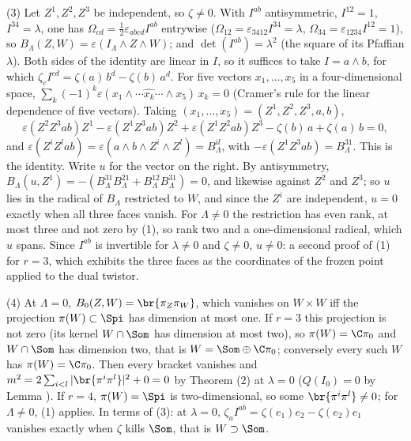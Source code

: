 (3) Let $Z^{1}, Z^{2}, Z^{3}$ be independent, so $\zeta \ne 0$. With $I^{ab}$ antisymmetric, $I^{12} = 1$, $I^{34} = \lambda$, one has $\Omega_{cd} = \tfrac12\varepsilon_{abcd}I^{ab}$ entrywise ($\Omega_{12} = \varepsilon_{3412}I^{34} = \lambda$, $\Omega_{34} = \varepsilon_{1234}I^{12} = 1$), so $B_{\Lambda}(Z, W) = \varepsilon(I_{\Lambda}\wedge Z\wedge W)$; and $\det(I^{ab}) = \lambda^{2}$ (the square of its Pfaffian $\lambda$). Both sides of the identity are linear in $I$, so it suffices to take $I = a\wedge b$, for which $\zeta_{c}I^{cd} = \zeta(a)\,b^{d} - \zeta(b)\,a^{d}$. For five vectors $x_{1}, \dots, x_{5}$ in a four-dimensional space, $\sum_{k}(-1)^{k}\varepsilon(x_{1}\wedge\cdots\widehat{x_{k}}\cdots\wedge x_{5})\,x_{k} = 0$ (Cramer's rule for the linear dependence of five vectors). Taking $(x_{1}, \dots, x_{5}) = (Z^{1}, Z^{2}, Z^{3}, a, b)$,
\[
\varepsilon(Z^{2}Z^{3}ab)Z^{1} - \varepsilon(Z^{1}Z^{3}ab)Z^{2} + \varepsilon(Z^{1}Z^{2}ab)Z^{3} - \zeta(b)\,a + \zeta(a)\,b = 0,
\]
and $\varepsilon(Z^{i}Z^{l}ab) = \varepsilon(a\wedge b\wedge Z^{i}\wedge Z^{l}) = B^{il}_{\Lambda}$, with $-\varepsilon(Z^{1}Z^{3}ab) = B^{31}_{\Lambda}$. This is the identity. Write $u$ for the vector on the right. By antisymmetry, $B_{\Lambda}(u, Z^{1}) = -(B^{31}_{\Lambda}B^{21}_{\Lambda} + B^{12}_{\Lambda}B^{31}_{\Lambda}) = 0$, and likewise against $Z^{2}$ and $Z^{3}$; so $u$ lies in the radical of $B_{\Lambda}$ restricted to $W$, and since the $Z^{i}$ are independent, $u = 0$ exactly when all three faces vanish. For $\Lambda \ne 0$ the restriction has even rank, at most three and not zero by (1), so rank two and a one-dimensional radical, which $u$ spans. Since $I^{ab}$ is invertible for $\lambda \ne 0$ and $\zeta \ne 0$, $u \ne 0$: a second proof of (1) for $r = 3$, which exhibits the three faces as the coordinates of the frozen point applied to the dual twistor.

(4) At $\Lambda = 0$, $B_{0}(Z, W) = \br{\pi_{Z}\pi_{W}}$, which vanishes on $W \times W$ iff the projection $\pi(W) \subset \Spi$ has dimension at most one. If $r = 3$ this projection is not zero (its kernel $W \cap \Som$ has dimension at most two), so $\pi(W) = \C\pi_{0}$ and $W \cap \Som$ has dimension two, that is $W = \Som \oplus \C\pi_{0}$; conversely every such $W$ has $\pi(W) = \C\pi_{0}$. Then every bracket vanishes and $m^{2} = 2\sum_{i<l}|\br{\pi^{i}\pi^{l}}|^{2} + 0 = 0$ by Theorem (2) at $\lambda = 0$ ($Q(I_{0}) = 0$ by Lemma ). If $r = 4$, $\pi(W) = \Spi$ is two-dimensional, so some $\br{\pi^{i}\pi^{l}} \ne 0$; for $\Lambda \ne 0$, (1) applies. In terms of (3): at $\lambda = 0$, $\zeta_{a}I^{ab} = \zeta(e_{1})e_{2} - \zeta(e_{2})e_{1}$ vanishes exactly when $\zeta$ kills $\Som$, that is $W \supset \Som$.

